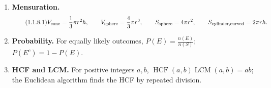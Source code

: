 \begin{enumerate}[label=\textbf{1.1.\arabic*.},ref=1.1.\arabic*]
\item \label{formula-1-1-8} \textbf{Mensuration.}
\begin{equation*}\tag{1.1.8.1}
V_{\rm cone}=\frac13\pi r^2h,\qquad
V_{\rm sphere}=\frac43\pi r^3,\qquad
S_{\rm sphere}=4\pi r^2,\qquad
S_{\rm cylinder,curved}=2\pi rh.
\end{equation*}
\item \label{formula-1-1-9} \textbf{Probability.} For equally likely outcomes, $P(E)=\frac{n(E)}{n(S)}$; $P(E^c)=1-P(E)$.
\item \label{formula-1-1-10} \textbf{HCF and LCM.} For positive integers $a,b$, $\operatorname{HCF}(a,b)\operatorname{LCM}(a,b)=ab$; the Euclidean algorithm finds the HCF by repeated division.
\end{enumerate}
